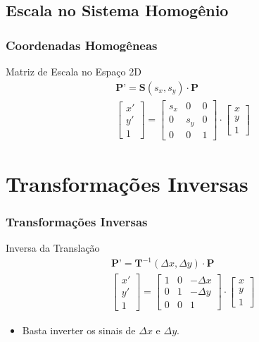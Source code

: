 \documentclass{beamer}
\begin{document}
\subsection{Escala no Sistema Homogênio}
\begin{frame}
\frametitle{Coordenadas Homogêneas}
	\begin{block}{Matriz de Escala no Espaço 2D}
		\begin{eqnarray*}
			\textbf{P'} = \textbf{S}(s_x,s_y) \cdot \textbf{P} \\
			\begin{bmatrix} 
					x' \\
					y' \\
					1
			\end{bmatrix}
			=	\begin{bmatrix}
					s_x	& 0 	& 0 \\
					0	& s_y 	& 0 \\
					0	& 0	& 1
					\end{bmatrix}
			\cdot \begin{bmatrix}
					x \\
					y \\
					1
				\end{bmatrix}
		\end{eqnarray*}
	\end{block}


\end{frame}

\section{Transformações Inversas}
\begin{frame}
\frametitle{Transformações Inversas}
	\begin{block}{Inversa da Translação}
		\begin{eqnarray*}
			\textbf{P'} = \textbf{T}^{-1}(\Delta x, \Delta y) \cdot \textbf{P} \\
			\begin{bmatrix} 
					x' \\
					y' \\
					1
			\end{bmatrix}
			=	\begin{bmatrix}
					1	& 0 	& -\Delta x \\
					0 	& 1	& -\Delta y \\
					0	& 0	& 1
					\end{bmatrix}
			\cdot \begin{bmatrix}
					x \\
					y \\
					1
				\end{bmatrix}
		\end{eqnarray*}
		\begin{itemize}
			\item Basta inverter os sinais de $\Delta x$ e $\Delta y$.
		\end{itemize}
	\end{block}
\end{frame}
\end{document}
